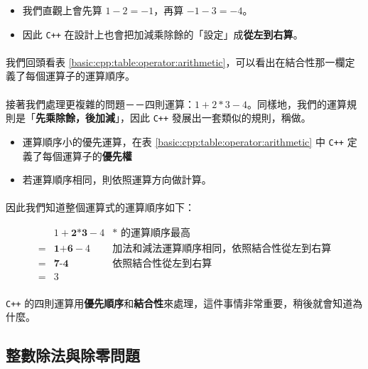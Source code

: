 \documentclass[12pt,a4paper,oneside]{report}
\begin{document}
\begin{CJK}{UTF8}{bkai}
\begin{itemize}
\item 我們直觀上會先算 $1-2=-1$，再算 $-1-3=-4$。
\item 因此 \texttt{C++} 在設計上也會把加減乘除餘的「設定」成\textbf{從左到右算}。
\end{itemize}

\paragraph{}我們回頭看表 \ref{basic:cpp:table:operator:arithmetic}，可以看出在結合性那一欄定義了每個運算子的運算順序。

\paragraph{}接著我們處理更複雜的問題－－四則運算：$1+2*3-4$。同樣地，我們的運算規則是「\textbf{先乘除餘，後加減}」，因此 \texttt{C++} 發展出一套類似的規則，稱做。

\begin{itemize}
\item 運算順序小的優先運算，在表 \ref{basic:cpp:table:operator:arithmetic} 中 \texttt{C++} 定義了每個運算子的\textbf{優先權}
\item 若運算順序相同，則依照運算方向做計算。
\end{itemize}

\paragraph{}因此我們知道整個運算式的運算順序如下：

\begin{align*}
  & 1+\textbf{2*3}-4 &*\text{ 的運算順序最高}\\
= & \textbf{1+6}-4   &\text{加法和減法運算順序相同，依照結合性從左到右算}\\
= & \textbf{7-4}     &\text{依照結合性從左到右算}\\
= & 3
\end{align*}

\paragraph{}\texttt{C++} 的四則運算用\textbf{優先順序}和\textbf{結合性}來處理，這件事情非常重要，稍後就會知道為什麼。

\subsection{整數除法與除零問題}


\end{CJK}
\end{document}
